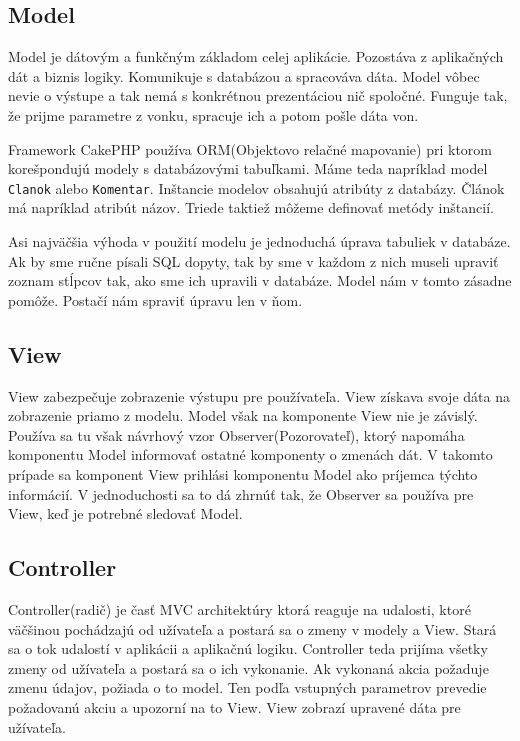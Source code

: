 \documentclass[12pt,onesided]{book}
\begin{document}
\subsection{Model}
Model je dátovým a funkčným základom celej aplikácie. Pozostáva z aplikačných dát a biznis logiky. Komunikuje s databázou a spracováva dáta. Model vôbec nevie o výstupe a tak nemá s konkrétnou prezentáciou nič spoločné. Funguje tak, že prijme parametre z vonku, spracuje ich a potom pošle dáta von. 

Framework CakePHP používa ORM(Objektovo relačné mapovanie) pri ktorom korešpondujú modely s databázovými tabuľkami. Máme teda napríklad model \texttt{Clanok} alebo \texttt{Komentar}. Inštancie modelov obsahujú atribúty z databázy. Článok má napríklad atribút názov. Triede taktiež môžeme definovať metódy inštancií.

Asi najväčšia výhoda v použití modelu je jednoduchá úprava tabuliek v databáze.  Ak by sme ručne písali SQL dopyty, tak by sme v každom z nich museli upraviť zoznam stĺpcov tak, ako sme ich upravili v databáze. Model nám v tomto zásadne pomôže. Postačí nám spraviť úpravu len v ňom.

\subsection{View}
View zabezpečuje zobrazenie výstupu pre používateľa. View získava svoje dáta na zobrazenie priamo z modelu. Model však na komponente View nie je závislý. Používa sa tu však návrhový vzor Observer(Pozorovateľ), ktorý napomáha komponentu Model  informovať ostatné komponenty o zmenách dát. V takomto prípade sa komponent View prihlási komponentu Model ako príjemca týchto informácií. V jednoduchosti sa to dá zhrnúť tak, že Observer sa používa pre View, keď je potrebné sledovať Model.



\subsection{Controller}
Controller(radič) je časť MVC architektúry ktorá reaguje na udalosti, ktoré väčšinou pochádzajú od užívateľa a postará sa o zmeny v modely a View.  Stará sa o tok udalostí v aplikácii a aplikačnú logiku. Controller teda prijíma všetky zmeny od užívateľa a postará sa o ich vykonanie. Ak vykonaná akcia požaduje zmenu údajov, požiada o to model. Ten podľa vstupných parametrov prevedie požadovanú akciu a upozorní na to View. View zobrazí upravené dáta pre užívateľa.
\end{document}
